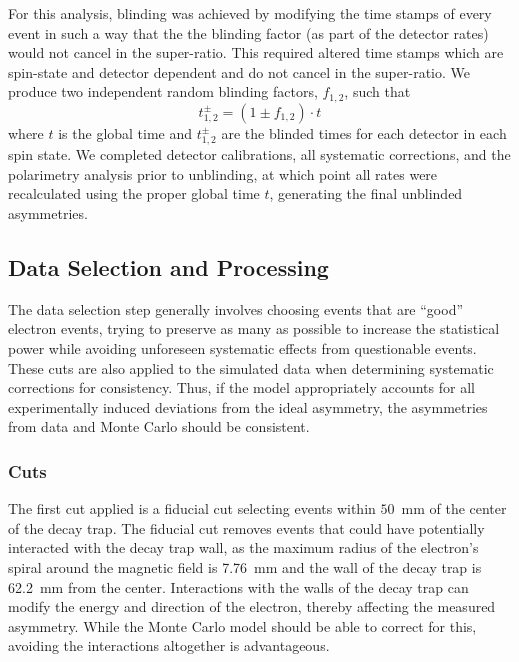 For this analysis, blinding was achieved by modifying the time stamps of every event
in such a way that the the blinding factor (as part of the
detector rates) would not cancel in the super-ratio. This required
altered time stamps which are spin-state and detector
dependent and do not cancel in the super-ratio. We produce two independent
random blinding factors, $f_{1,2}$, such that
%
\begin{equation}
  t^{\pm}_{1,2} = (1 \pm f_{1,2}) \cdot t
\end{equation}
%
\noindent where $t$ is the global time
and $t^{\pm}_{1,2}$ are the blinded times for each detector in each spin state. We completed
detector calibrations, all systematic corrections, and the polarimetry analysis prior to
unblinding, at which point all rates were recalculated using the proper global time $t$,
generating the final unblinded asymmetries.

\subsection{Data Selection and Processing}

The data selection step generally involves choosing events that are ``good'' electron
events, trying to preserve as many as possible to increase the statistical power while avoiding
unforeseen systematic effects from questionable events. These cuts are also applied to
the simulated data when determining systematic corrections for consistency. Thus, if the
model appropriately accounts for all experimentally induced deviations from the ideal
asymmetry, the asymmetries from data and Monte Carlo should be consistent.

\subsubsection{Cuts} \label{ssec:dataCuts}%

The first cut applied is a fiducial cut
selecting events within $50$~mm of the center of the decay trap. The fiducial cut removes
events that could have potentially interacted with the decay trap wall, as the
maximum radius of the electron's spiral around the magnetic field is 7.76~mm and the wall
of the decay trap is 62.2~mm from the center. Interactions with the walls of the decay trap
can modify the energy and direction of the electron, thereby affecting the measured
asymmetry. While the Monte Carlo model should be able to correct for this, avoiding the
interactions altogether is advantageous.

